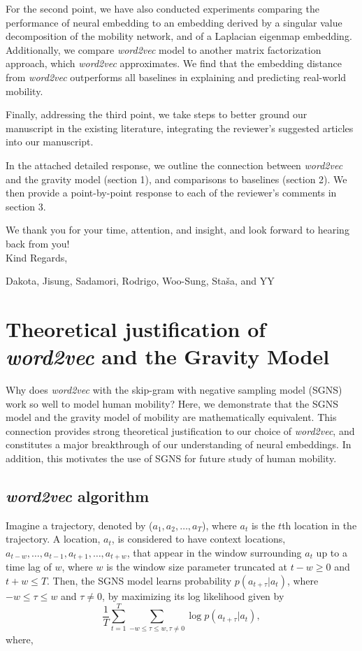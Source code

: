 \documentclass[12pt,a4paper]{article}
\begin{document}
For the second point, we have also conducted experiments comparing the performance of neural embedding to an embedding derived by a singular value decomposition of the mobility network, and of a Laplacian eigenmap embedding. 
Additionally, we compare \textit{word2vec} model to another matrix factorization approach, which \textit{word2vec} approximates. We find that the embedding distance from \textit{word2vec} outperforms all baselines in explaining and predicting real-world mobility.

Finally, addressing the third point, we take steps to better ground our manuscript in the existing literature, integrating the reviewer's suggested articles into our manuscript.

In the attached detailed response, we outline the connection between \textit{word2vec} and the gravity model (section 1), and comparisons to baselines (section 2). We then provide a point-by-point response to each of the reviewer's comments in section 3.

We thank you for your time, attention, and insight, and look forward to hearing back from you!\\

Kind Regards,

Dakota, Jisung, Sadamori, Rodrigo, Woo-Sung, Staša, and YY


\clearpage
\tableofcontents
\clearpage


\section{Theoretical justification of \textit{word2vec} and the Gravity Model}
\label{sec:theory}
Why does \textit{word2vec} with the skip-gram with negative sampling model (SGNS) work so well to model human mobility?
Here, we demonstrate that the SGNS model and the gravity model of mobility are mathematically equivalent.
This connection provides strong theoretical justification to our choice of \textit{word2vec}, and constitutes a major breakthrough of our understanding of neural embeddings.
In addition, this motivates the use of SGNS for future study of human mobility.

\subsection{\textit{word2vec} algorithm}
Imagine a trajectory, denoted by ($a_{1}, a_{2}, \ldots, a_{T}$), where $a_{t}$ is the $t$th location in the trajectory. A location, $a_{t}$, is considered to have context locations, $a_{t-w}, \ldots, a_{t-1}, a_{t+1},\ldots, a_{t+w}$, that appear in the window surrounding $a_t$ up to a time lag of $w$, where $w$ is the window size parameter truncated at $t - w \geq 0$ and $t + w \leq T$. 
Then, the SGNS model learns probability $p(a_{t + \tau} \vert a_{t})$, where $-w\leq \tau\leq w$ and $\tau \neq 0$,  by maximizing its log likelihood given by
%
%
\begin{equation}
	\frac{1}{T}\sum_{t = 1}^{T} \sum_{-w \leq \tau \leq w, \tau \neq 0} \log p(a_{t + \tau} \vert a_{t}),
\end{equation}
where,
\end{document}
